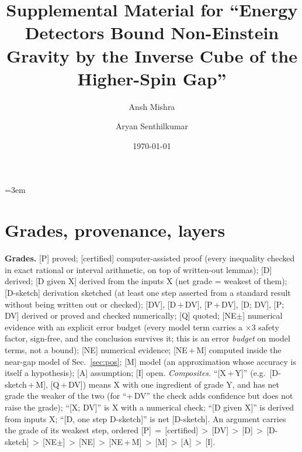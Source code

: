 \documentclass[aps,prl,onecolumn,superscriptaddress,nofootinbib]{revtex4-2}
\begin{document}
\emergencystretch=3em

\title{Supplemental Material for ``Energy Detectors Bound Non-Einstein Gravity by the Inverse Cube of the Higher-Spin Gap''}

\author{Ansh Mishra}
\author{Aryan Senthilkumar}

\date{\today}
\maketitle
\setcounter{secnumdepth}{2}

\section{Grades, provenance, layers}
\label{sec:grades}

\textbf{Grades.} [P] proved; [certified] computer-assisted proof (every inequality checked in exact
rational or interval arithmetic, on top of written-out lemmas); [D] derived; [D given X] derived from the
inputs X (net grade = weakest of them); [D-sketch] derivation sketched (at least one step asserted from a
standard result without being written out or checked); [DV], [D\,+\,DV], [P\,+\,DV], [D; DV], [P; DV] derived or proved and
checked numerically; [Q] quoted; [NE$\pm$] numerical evidence with an explicit error budget (every model
term carries a $\times3$ safety factor, sign-free, and the conclusion survives it; this is an error
\emph{budget} on model terms, not a bound); [NE] numerical evidence; [NE\,+\,M]
computed inside the near-gap model of Sec.~\ref{sec:pos}; [M] model (an approximation whose accuracy is
itself a hypothesis); [A] assumption; [I] open. \emph{Composites.} ``[X\,+\,Y]'' (e.g.\ [D-sketch\,+\,M],
[Q\,+\,DV]) means X with one ingredient of grade Y, and has net grade the weaker of the two (for ``+\,DV'' the
check adds confidence but does not raise the grade); ``[X; DV]'' is X with a numerical check; ``[D given X]''
is derived from inputs X; ``[D, one step D-sketch]'' is net [D-sketch]. An argument carries the grade of its weakest step, ordered
[P]\,$=$\,[certified]\,$>$\,[DV]\,$>$\,[D]\,$>$\,[D-sketch]\,$>$\,[NE$\pm$]\,$>$\,[NE]\,$>$\,[NE\,+\,M]\,$>$\,[M]\,$>$\,[A]\,$>$\,[I].
\end{document}
